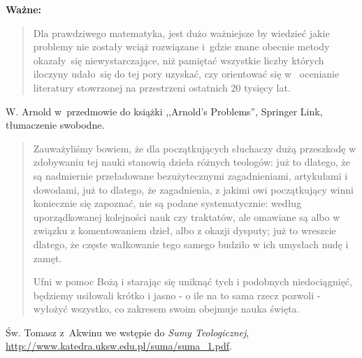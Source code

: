 \documentclass[a4paper,11pt]{article}
\begin{document}
\textbf{Ważne:}
\begin{quote}
Dla prawdziwego matematyka, jest dużo ważniejsze by wiedzieć jakie problemy nie zostały wciąż rozwiązane i~gdzie znane obecnie metody okazały~się niewystarczające, niż pamiętać wszystkie liczby których iloczyny udało~się do tej pory uzyskać, czy orientować się w~ ocenianie literatury stowrzonej na przestrzeni ostatnich 20 tysięcy lat.
\end{quote}
W. Arnold w~przedmowie do książki ,,Arnold's Problems'', Springer Link, tłumaczenie swobodne.\\
\begin{quote}
Zauważyliśmy bowiem, że dla początkujących słuchaczy dużą przeszkodę w
zdobywaniu tej nauki stanowią dzieła różnych teologów: już to dlatego, że są nadmiernie
przeładowane bezużytecznymi zagadnieniami, artykułami i dowodami, już to dlatego, że
zagadnienia, z jakimi owi początkujący winni koniecznie się zapoznać, nie są podane
systematycznie: według uporządkowanej kolejności nauk czy traktatów, ale omawiane są
albo w związku z komentowaniem dzieł, albo z okazji dysputy; już to wreszcie
dlatego, że częste wałkowanie tego samego budziło w ich umysłach nudę i zamęt.

Ufni w pomoc Bożą i starając się uniknąć tych i podobnych niedociągnięć,
będziemy usiłowali krótko i jasno - o ile na to sama rzecz pozwoli - wyłożyć wszystko, co zakresem swoim obejmuje nauka święta.
\end{quote}
Św. Tomasz z~Akwinu we wstępie do \emph{Sumy Teologicznej}, \url{http://www.katedra.uksw.edu.pl/suma/suma_1.pdf}.


{}
\end{document}
